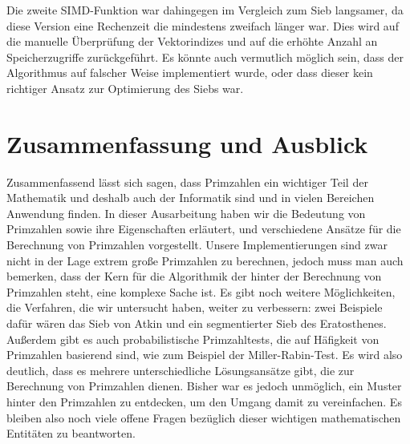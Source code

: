 \documentclass[course=erap]{aspdoc}
\begin{document}
Die zweite SIMD-Funktion war dahingegen im Vergleich zum Sieb langsamer, da diese Version eine Rechenzeit die mindestens zweifach länger war. Dies wird auf die manuelle Überprüfung der Vektorindizes und auf die erhöhte Anzahl an Speicherzugriffe zurückgeführt. Es könnte auch vermutlich möglich sein, dass der Algorithmus auf falscher Weise implementiert wurde, oder dass dieser kein richtiger Ansatz zur Optimierung des Siebs war.
\section{Zusammenfassung und Ausblick}
Zusammenfassend lässt sich sagen, dass Primzahlen ein wichtiger Teil der Mathematik und deshalb auch der Informatik sind und in vielen Bereichen Anwendung finden. In dieser Ausarbeitung haben wir die Bedeutung von Primzahlen sowie ihre Eigenschaften erläutert, und verschiedene Ansätze für die Berechnung von Primzahlen vorgestellt. Unsere Implementierungen sind zwar nicht in der Lage extrem große Primzahlen zu berechnen, jedoch muss man auch bemerken, dass der Kern für die Algorithmik der hinter der Berechnung von Primzahlen steht, eine komplexe Sache ist. Es gibt noch weitere Möglichkeiten, die Verfahren, die wir untersucht haben, weiter zu verbessern: zwei Beispiele dafür wären das Sieb von Atkin und ein segmentierter Sieb des Eratosthenes. Außerdem gibt es auch probabilistische Primzahltests, die auf Häfigkeit von Primzahlen basierend sind, wie zum Beispiel der Miller-Rabin-Test. Es wird also deutlich, dass es mehrere unterschiedliche Lösungsansätze gibt, die zur Berechnung von Primzahlen dienen. Bisher war es jedoch unmöglich, ein Muster hinter den Primzahlen zu entdecken, um den Umgang damit zu vereinfachen. Es bleiben also noch viele offene Fragen bezüglich dieser wichtigen mathematischen Entitäten zu beantworten. 
\\
\\
\\
\\
\\
\\
\\

{}
\end{document}

